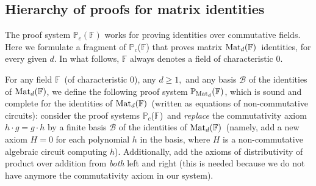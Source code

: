 \documentclass[12pt,reqno]{article}
\newtheorem{proposition}[theorem]{Proposition}
\newcommand\F{\ensuremath{\mathbb F}}
\newcommand\PP{{\mathbb P}}
\newcommand\PC{\ensuremath{\PP_c}}
\newcommand\PMd{\ensuremath{\PP_{{\rm Mat}_d}(\F)}}
\newcommand{\cd}{\cdot}
\newcommand{\matd}{{\ensuremath{{\rm Mat}_d(\F)}}}
\newcommand{\set}[1]{\left\{#1\right\}}
\newcommand{\degr}[2]{\left(#1\right)^{(#2)}}
\begin{document}
%
%
%



\subsection{Hierarchy of proofs for matrix identities }\label{sec:system-diff-algebras}
The proof system $\PC(\F)$ works for proving identities over commutative fields. Here we  formulate  a fragment of \PC(\F) that proves matrix \matd\ identities, for every given $d$. In what follows, $\F$ always denotes a field of characteristic $0$.

For any field \F\ (of characteristic 0), any $d\ge 1,$ and any basis \(\mathcal B\) of the identities of \matd, we define the following proof system \PMd, which is sound and complete for the identities of \matd\ (written as equations of non-commutative circuits): consider the proof systems  \PC(\F)\ and \textit{replace }the commutativity axiom \(h\cd g=g\cd h\) by  a finite basis \(\mathcal B\) of the identities of  \matd\  (namely, add a new axiom $H=0$ for each polynomial $h$ in the basis, where $H$ is a non-commutative algebraic circuit computing $h$). Additionally, add the axioms of  distributivity of product over addition from \textit{both} left and right (this is needed because we do not have anymore the commutativity axiom in our system).
\end{document}
